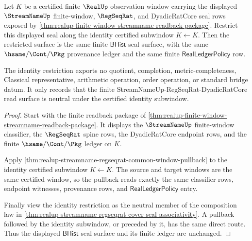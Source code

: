 \begin{theorem}
\label{thm:realup-streamname-regseqrat-cover-identity-seal}
Let $K$ be a certified finite $\RealUp$ observation window carrying the
displayed $\StreamNameUp$ finite-window, $\RegSeqRat$, and
DyadicRatCore seal rows exposed by
\autoref{thm:realup-finite-window-streamname-readback-package}. Restrict this
displayed seal along the identity certified subwindow $K\leftarrow K$. Then the
restricted surface is the same finite $\mathsf{BHist}$ seal surface, with the
same $\hsame/\Cont/\Pkg$ provenance ledger and the same finite
$\mathsf{RealLedgerPolicy}$ row.

The identity restriction exports no quotient, completion, metric-completeness,
Classical representative, arithmetic operation, order operation, or standard
bridge datum. It only records that the finite
StreamNameUp-RegSeqRat-DyadicRatCore read surface is neutral under the
certified identity subwindow.
\end{theorem}
\begin{proof}
Start with the finite readback package of
\autoref{thm:realup-finite-window-streamname-readback-package}. It displays the
$\StreamNameUp$ finite-window classifier, the $\RegSeqRat$ spine rows, the
DyadicRatCore endpoint rows, and the finite $\hsame/\Cont/\Pkg$ ledger on $K$.

Apply \autoref{thm:realup-streamname-regseqrat-common-window-pullback} to the
identity certified subwindow $K\leftarrow K$. The source and target windows
are the same certified window, so the pullback reads exactly the same
classifier rows, endpoint witnesses, provenance rows, and
$\mathsf{RealLedgerPolicy}$ entry.

Finally view the identity restriction as the neutral member of the composition
law in \autoref{thm:realup-streamname-regseqrat-cover-seal-associativity}. A
pullback followed by the identity subwindow, or preceded by it, has the same
direct route. Thus the displayed $\mathsf{BHist}$ seal surface and its finite
ledger are unchanged.
\end{proof}

